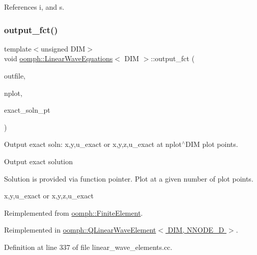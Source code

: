 References i, and s.

\mbox{\label{classoomph_1_1LinearWaveEquations_a3ae24c98f2d190e56fe24e754de682d8}} 
\subsubsection{\texorpdfstring{output\+\_\+fct()}{output\_fct()}\hspace{0.1cm}{\footnotesize\ttfamily [1/2]}}
{\footnotesize\ttfamily template$<$unsigned D\+IM$>$ \\
void \hyperlink{classoomph_1_1LinearWaveEquations}{oomph\+::\+Linear\+Wave\+Equations}$<$ D\+IM $>$\+::output\+\_\+fct (\begin{DoxyParamCaption}\item[{std\+::ostream \&}]{outfile,  }\item[{const unsigned \&}]{nplot,  }\item[{\hyperlink{classoomph_1_1FiniteElement_a690fd33af26cc3e84f39bba6d5a85202}{Finite\+Element\+::\+Steady\+Exact\+Solution\+Fct\+Pt}}]{exact\+\_\+soln\+\_\+pt }\end{DoxyParamCaption})\hspace{0.3cm}{\ttfamily [virtual]}}



Output exact soln\+: x,y,u\+\_\+exact or x,y,z,u\+\_\+exact at nplot$^\wedge$\+D\+IM plot points. 

Output exact solution

Solution is provided via function pointer. Plot at a given number of plot points.

x,y,u\+\_\+exact or x,y,z,u\+\_\+exact 

Reimplemented from \hyperlink{classoomph_1_1FiniteElement_a22b695c714f60ee6cd145be348042035}{oomph\+::\+Finite\+Element}.



Reimplemented in \hyperlink{classoomph_1_1QLinearWaveElement_af72b64dee3c8690aca4734d7f41515bc}{oomph\+::\+Q\+Linear\+Wave\+Element$<$ D\+I\+M, N\+N\+O\+D\+E\+\_\+D $>$}.



Definition at line 337 of file linear\+\_\+wave\+\_\+elements.\+cc.



